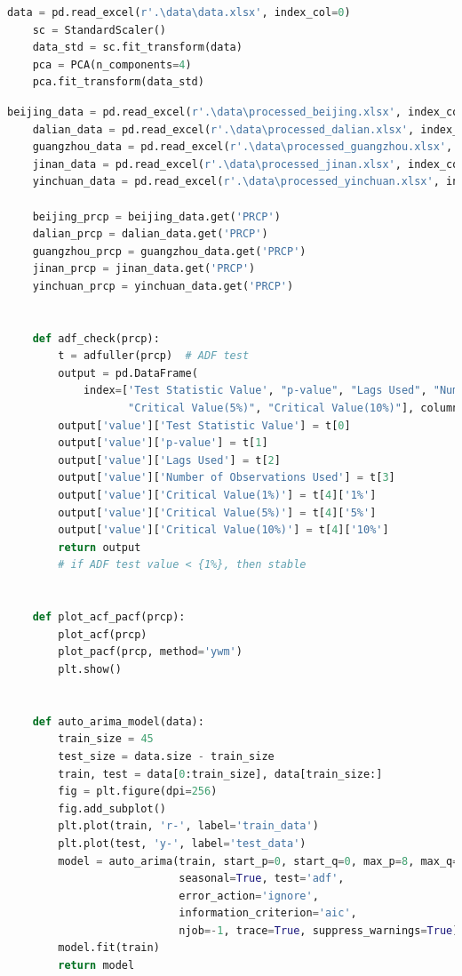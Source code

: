 \documentclass{swmcmthesis}
\begin{document}
\begin{lstlisting}[language=Python,caption={The Python Source code of PCA}]
    data = pd.read_excel(r'.\data\data.xlsx', index_col=0)
    sc = StandardScaler()
    data_std = sc.fit_transform(data)
    pca = PCA(n_components=4)
    pca.fit_transform(data_std)

\end{lstlisting}
\begin{lstlisting}[language=Python,caption={The Python Source code of ARIMA}]
    beijing_data = pd.read_excel(r'.\data\processed_beijing.xlsx', index_col=0, skiprows=0)
    dalian_data = pd.read_excel(r'.\data\processed_dalian.xlsx', index_col=0, skiprows=0)
    guangzhou_data = pd.read_excel(r'.\data\processed_guangzhou.xlsx', index_col=0, skiprows=0)
    jinan_data = pd.read_excel(r'.\data\processed_jinan.xlsx', index_col=0, skiprows=0)
    yinchuan_data = pd.read_excel(r'.\data\processed_yinchuan.xlsx', index_col=0, skiprows=0)
    
    beijing_prcp = beijing_data.get('PRCP')
    dalian_prcp = dalian_data.get('PRCP')
    guangzhou_prcp = guangzhou_data.get('PRCP')
    jinan_prcp = jinan_data.get('PRCP')
    yinchuan_prcp = yinchuan_data.get('PRCP')
    
    
    def adf_check(prcp):
        t = adfuller(prcp)  # ADF test
        output = pd.DataFrame(
            index=['Test Statistic Value', "p-value", "Lags Used", "Number of Observations Used", "Critical Value(1%)",
                   "Critical Value(5%)", "Critical Value(10%)"], columns=['value'])
        output['value']['Test Statistic Value'] = t[0]
        output['value']['p-value'] = t[1]
        output['value']['Lags Used'] = t[2]
        output['value']['Number of Observations Used'] = t[3]
        output['value']['Critical Value(1%)'] = t[4]['1%']
        output['value']['Critical Value(5%)'] = t[4]['5%']
        output['value']['Critical Value(10%)'] = t[4]['10%']
        return output
        # if ADF test value < {1%}, then stable
    
    
    def plot_acf_pacf(prcp):
        plot_acf(prcp)
        plot_pacf(prcp, method='ywm')
        plt.show()
    
    
    def auto_arima_model(data):
        train_size = 45
        test_size = data.size - train_size
        train, test = data[0:train_size], data[train_size:]
        fig = plt.figure(dpi=256)
        fig.add_subplot()
        plt.plot(train, 'r-', label='train_data')
        plt.plot(test, 'y-', label='test_data')
        model = auto_arima(train, start_p=0, start_q=0, max_p=8, max_q=8, max_d=2,
                           seasonal=True, test='adf',
                           error_action='ignore',
                           information_criterion='aic',
                           njob=-1, trace=True, suppress_warnings=True)
        model.fit(train)
        return model
    

\end{lstlisting}
\end{document}
